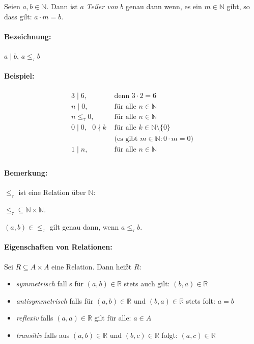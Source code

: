 
Seien $a, b \in \mathbb{N}$. Dann ist $a$ \emph{Teiler von} $b$ genau dann wenn,
es ein $m \in \mathbb{N}$ gibt, so dass gilt: $a \cdot m = b$.

\paragraph{Bezeichnung:} $a \mid b$, $a \le_\tau b$

\paragraph{Beispiel:}
\begin{align*}
3 \mid 6,                    & \text{ denn }     3 \cdot 2 = 6    \\
n \mid 0,                    & \text{ für alle } n \in \mathbb{N} \\
n \le_\tau 0,                 & \text{ für alle } n \in \mathbb{N} \\
0 \mid 0, \text{ } 0 \nmid k & \text{ für alle } k \in \mathbb{N} \setminus \{0\} \\
                             & \text{ (es gibt }  m \in \mathbb{N}: 0 \cdot m = 0 \text{)} \\
1 \mid n,                    & \text{ für alle } n \in \mathbb{N} \\
\end{align*}

\paragraph{Bemerkung:}
$\le_\tau$ ist eine Relation über $\mathbb{N}$:

$\le_\tau \subseteq \mathbb{N} \times \mathbb{N}$.

$(a,b) \in \le_\tau$ gilt genau dann, wenn $a \le_\tau b$.

\paragraph{Eigenschaften von Relationen:}

Sei $R \subseteq A \times A$ eine Relation. Dann heißt $R$:
\begin{itemize}
\item \emph{symmetrisch} fall
  s für $(a, b) \in \mathbb{R}$ stets auch gilt: $(b, a) \in \mathbb{R}$
 \item \emph{antisymmetrisch} falls für $(a, b) \in \mathbb{R}$ und $(b, a) \in \mathbb{R}$  stets folt: $a = b$
 \item \emph{reflexiv} falls $(a, a) \in \mathbb{R}$ gilt für alle: $a \in A$
 \item \emph{transitiv} falls aus $(a, b) \in \mathbb{R}$ und $(b, c) \in \mathbb{R}$ folgt: $(a, c) \in \mathbb{R}$
\end{itemize}

